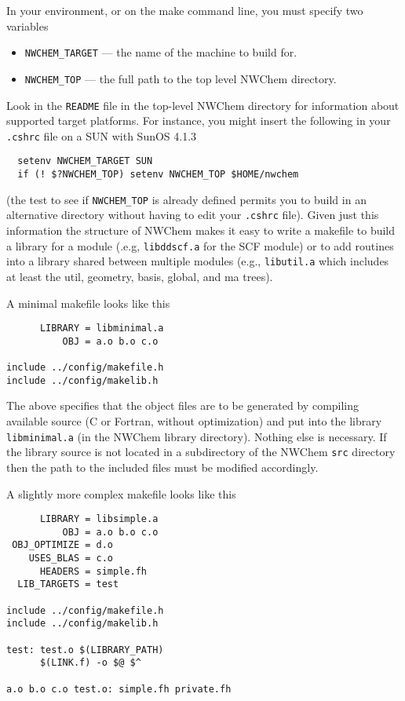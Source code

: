 
In your environment, or on the make command line, you must specify two
variables
\begin{itemize}
\item {\tt NWCHEM\_TARGET} --- the name of the machine to build for.
\item {\tt NWCHEM\_TOP} --- the full path to the top level NWChem
  directory.
\end{itemize}
Look in the {\tt README} file in the top-level NWChem directory for
information about supported target platforms.  For instance, you might
insert the following in your \verb+.cshrc+ file on a SUN with SunOS
4.1.3 
\begin{verbatim}
  setenv NWCHEM_TARGET SUN
  if (! $?NWCHEM_TOP) setenv NWCHEM_TOP $HOME/nwchem
\end{verbatim}
(the test to see if \verb+NWCHEM_TOP+ is already defined permits you
to build in an alternative directory without having to edit your
\verb+.cshrc+ file).  Given just this information the structure of
NWChem makes it easy to write a makefile to build a library for a
module (.e.g, {\tt libddscf.a} for the SCF module) or to add routines
into a library shared between multiple modules (e.g., {\tt libutil.a}
which includes at least the util, geometry, basis, global, and ma
trees).

A minimal makefile looks like this
\begin{verbatim}
      LIBRARY = libminimal.a
          OBJ = a.o b.o c.o

include ../config/makefile.h
include ../config/makelib.h
\end{verbatim}

The above specifies that the object files are to be generated by
compiling available source (C or Fortran, without optimization) and
put into the library {\tt libminimal.a} (in the NWChem library
directory).  Nothing else is necessary.  If the library source is not
located in a subdirectory of the NWChem {\tt src} directory then the
path to the included files must be modified accordingly.

A slightly more complex makefile looks like this
\begin{verbatim}
      LIBRARY = libsimple.a
          OBJ = a.o b.o c.o
 OBJ_OPTIMIZE = d.o
    USES_BLAS = c.o
      HEADERS = simple.fh
  LIB_TARGETS = test

include ../config/makefile.h
include ../config/makelib.h

test: test.o $(LIBRARY_PATH)
      $(LINK.f) -o $@ $^

a.o b.o c.o test.o: simple.fh private.fh
\end{verbatim}

